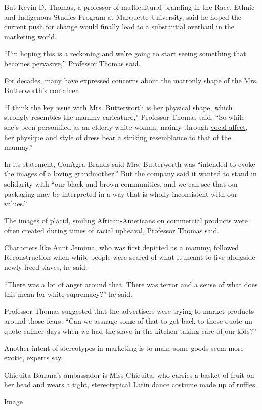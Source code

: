 But Kevin D. Thomas, a professor of multicultural branding in the Race,
Ethnic and Indigenous Studies Program at Marquette University, said he
hoped the current push for change would finally lead to a substantial
overhaul in the marketing world.

``I'm hoping this is a reckoning and we're going to start seeing
something that becomes pervasive,'' Professor Thomas said.

For decades, many have expressed concerns about the matronly shape of
the Mrs. Butterworth's container.

``I think the key issue with Mrs. Butterworth is her physical shape,
which strongly resembles the mammy caricature,'' Professor Thomas said.
``So while she's been personified as an elderly white woman, mainly
through \href{https://www.youtube.com/watch?v=z45ys7oJuCA}{vocal
affect}, her physique and style of dress bear a striking resemblance to
that of the mammy.''

In its statement, ConAgra Brands said Mrs. Butterworth was ``intended to
evoke the images of a loving grandmother.'' But the company said it
wanted to stand in solidarity with ``our black and brown communities,
and we can see that our packaging may be interpreted in a way that is
wholly inconsistent with our values.''

The images of placid, smiling African-Americans on commercial products
were often created during times of racial upheaval, Professor Thomas
said.

Characters like Aunt Jemima, who was first depicted as a mammy, followed
Reconstruction when white people were scared of what it meant to live
alongside newly freed slaves, he said.

``There was a lot of angst around that. There was terror and a sense of
what does this mean for white supremacy?'' he said.

Professor Thomas suggested that the advertisers were trying to market
products around those fears: ``Can we assuage some of that to get back
to those quote-un-quote calmer days when we had the slave in the kitchen
taking care of our kids?''

Another intent of stereotypes in marketing is to make some goods seem
more exotic, experts say.

Chiquita Banana's ambassador is Miss Chiquita, who carries a basket of
fruit on her head and wears a tight, stereotypical Latin dance costume
made up of ruffles.

Image

